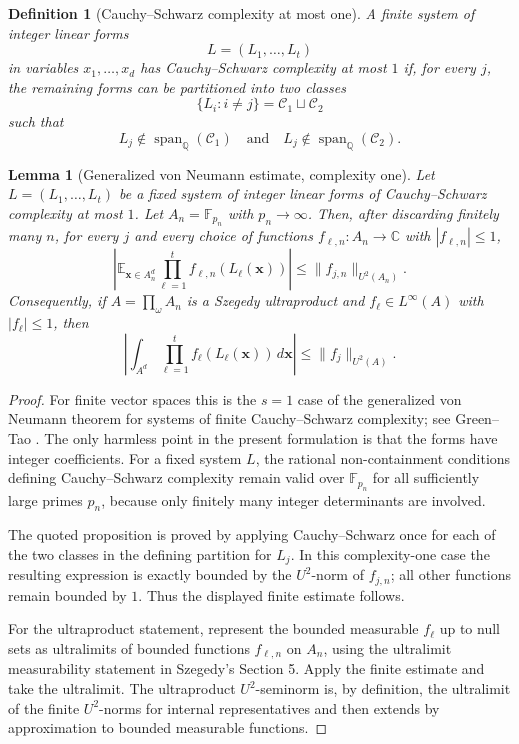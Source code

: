 \documentclass[11pt]{article}
\numberwithin{equation}{section}
\newtheorem{lemma}[theorem]{Lemma}
\newtheorem{definition}[theorem]{Definition}
\newcommand{\E}{\mathbb E}
\newcommand{\F}{\mathbb F}
\newcommand{\C}{\mathbb C}
\newcommand{\1}{\mathbf 1}
\newcommand{\Span}{\operatorname{span}}
\begin{document}
\begin{definition}[Cauchy--Schwarz complexity at most one]
A finite system of integer linear forms
\[
        L=(L_1,\ldots,L_t)
\]
in variables \(x_1,\ldots,x_d\) has Cauchy--Schwarz complexity at most
\(1\) if, for every \(j\), the remaining forms can be partitioned into two
classes
\[
        \{L_i:i\ne j\}=\mathcal C_1\sqcup\mathcal C_2
\]
such that
\[
        L_j\notin\Span_{\mathbb Q}(\mathcal C_1)
        \quad\text{and}\quad
        L_j\notin\Span_{\mathbb Q}(\mathcal C_2).
\]
\end{definition}

\begin{lemma}[Generalized von Neumann estimate, complexity one]
\label{lem:gvn}
Let \(L=(L_1,\ldots,L_t)\) be a fixed system of integer linear forms of
Cauchy--Schwarz complexity at most \(1\).  Let \(A_n=\F_{p_n}\) with
\(p_n\to\infty\).  Then, after discarding finitely many \(n\), for every
\(j\) and every choice of functions \(f_{\ell,n}:A_n\to\C\) with
\(|f_{\ell,n}|\le1\),
\[
\left|
\E_{\mathbf x\in A_n^d}
\prod_{\ell=1}^t f_{\ell,n}(L_\ell(\mathbf x))
\right|
\le
\|f_{j,n}\|_{U^2(A_n)}.
\]
Consequently, if \(A=\prod_\omega A_n\) is a Szegedy ultraproduct and
\(f_\ell\in L^\infty(A)\) with \(|f_\ell|\le1\), then
\[
\left|
\int_{A^d}
\prod_{\ell=1}^t f_\ell(L_\ell(\mathbf x))\,d\mathbf x
\right|
\le
\|f_j\|_{U^2(A)}.
\]
\end{lemma}

\begin{proof}
For finite vector spaces this is the \(s=1\) case of the generalized von
Neumann theorem for systems of finite Cauchy--Schwarz complexity; see
Green--Tao \cite[Proposition 7.1]{GreenTaoPrimes}.  The only harmless
point in the present formulation is that the forms have integer
coefficients.  For a fixed system \(L\), the rational non-containment
conditions defining Cauchy--Schwarz complexity remain valid over
\(\F_{p_n}\) for all sufficiently large primes \(p_n\), because only
finitely many integer determinants are involved.

The quoted proposition is proved by applying Cauchy--Schwarz once for each
of the two classes in the defining partition for \(L_j\).  In this
complexity-one case the resulting expression is exactly bounded by the
\(U^2\)-norm of \(f_{j,n}\); all other functions remain bounded by \(1\).
Thus the displayed finite estimate follows.

For the ultraproduct statement, represent the bounded measurable
\(f_\ell\) up to null sets as ultralimits of bounded functions
\(f_{\ell,n}\) on \(A_n\), using the ultralimit measurability statement in
Szegedy's Section 5.  Apply the finite estimate and take the ultralimit.
The ultraproduct \(U^2\)-seminorm is, by definition, the ultralimit of the
finite \(U^2\)-norms for internal representatives and then extends by
approximation to bounded measurable functions.
\end{proof}
\end{document}
